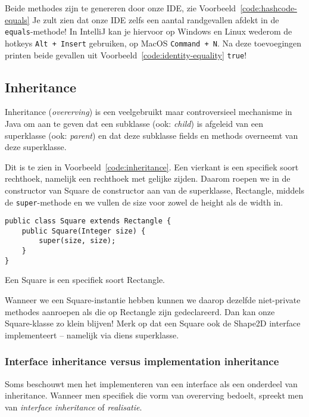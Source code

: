 \documentclass[dutch,a4paper,12pt,doubleside]{book}
\begin{document}
Beide methodes zijn te genereren door onze IDE, zie Voorbeeld~\ref{code:hashcode-equals}
Je zult zien dat onze IDE zelfs een aantal randgevallen afdekt in de \texttt{equals}-methode!
In IntelliJ kan je hiervoor op Windows en Linux wederom 
de hotkeys \texttt{Alt + Insert} gebruiken, op MacOS \texttt{Command + N}.
Na deze toevoegingen printen beide gevallen uit Voorbeeld~\ref{code:identity-equality}
\texttt{true}!

\subsection{Inheritance}
Inheritance (\textit{overerving}) is een veelgebruikt maar controversieel mechanisme in Java 
om aan te geven dat een subklasse (ook: \textit{child}) is afgeleid van 
een superklasse (ook: \textit{parent}) en dat deze subklasse  
fields en methods overneemt van deze superklasse.

Dit is te zien in Voorbeeld~\ref{code:inheritance}. Een vierkant is een 
specifiek soort rechthoek, namelijk een rechthoek met gelijke zijden.
Daarom roepen we in de constructor van Square de constructor aan van 
de superklasse, Rectangle, middels de \texttt{super}-methode en we vullen 
de size voor zowel de height als de width in.

\begin{listing}[H]
\begin{verbatim}
public class Square extends Rectangle {
    public Square(Integer size) {
        super(size, size);
    }
}
\end{verbatim}
\caption{Een Square is een specifiek soort Rectangle.}
\label{code:inheritance}
\end{listing}

Wanneer we een Square-instantie hebben kunnen we daarop dezelfde 
niet-private methodes aanroepen als die op Rectangle zijn gedeclareerd.
Dan kan onze Square-klasse zo klein blijven!
Merk op dat een Square ook de Shape2D interface implementeert 
-- namelijk via diens superklasse.

\subsubsection{Interface inheritance versus implementation inheritance}
Soms beschouwt men het implementeren van een interface
als een onderdeel van inheritance. Wanneer men specifiek 
die vorm van overerving bedoelt, spreekt men van \textit{interface inheritance}
of \textit{realisatie}.
\end{document}
